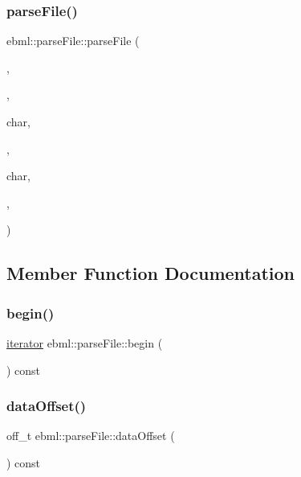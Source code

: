 \subsubsection{\texorpdfstring{parse\+File()}{parseFile()}\hspace{0.1cm}{\footnotesize\ttfamily [10/10]}}
{\footnotesize\ttfamily ebml\+::parse\+File\+::parse\+File (\begin{DoxyParamCaption}\item[{\mbox{\hyperlink{classebml_1_1ioBase}{io\+Base}} $\ast$}]{,  }\item[{\mbox{\hyperlink{namespaceebml_a86c5f604ddf12a74aa9812e997a58691}{ebml\+I\+D\+\_\+t}}}]{,  }\item[{unsigned}]{char,  }\item[{size\+\_\+t}]{,  }\item[{unsigned}]{char,  }\item[{off\+\_\+t}]{,  }\item[{\mbox{\hyperlink{classebml_1_1parseFile}{parse\+File}} \&}]{ }\end{DoxyParamCaption})\hspace{0.3cm}{\ttfamily [protected]}}



\subsection{Member Function Documentation}
\mbox{\label{classebml_1_1parseFile_aaa18341bf2735f25e4302f38dbd51748}} 
\subsubsection{\texorpdfstring{begin()}{begin()}}
{\footnotesize\ttfamily \mbox{\hyperlink{classebml_1_1parseFile_1_1iterator}{iterator}} ebml\+::parse\+File\+::begin (\begin{DoxyParamCaption}{ }\end{DoxyParamCaption}) const}

\mbox{\label{classebml_1_1parseFile_af1b31606933caa71ac6c7b2556607eb8}} 
\subsubsection{\texorpdfstring{data\+Offset()}{dataOffset()}}
{\footnotesize\ttfamily off\+\_\+t ebml\+::parse\+File\+::data\+Offset (\begin{DoxyParamCaption}{ }\end{DoxyParamCaption}) const}

